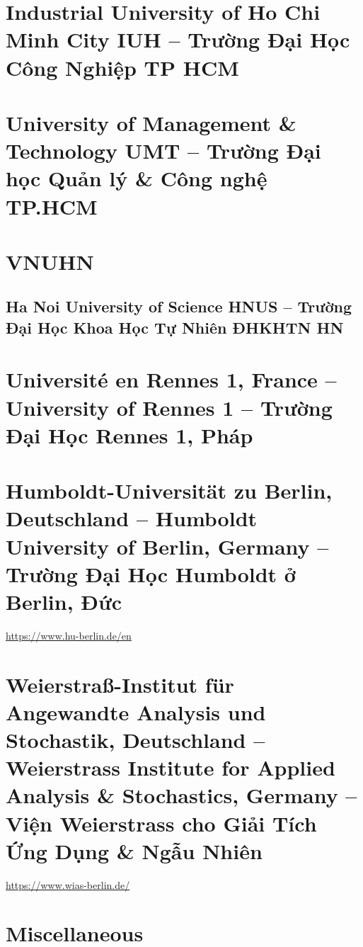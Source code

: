 \documentclass{article}
\begin{document}
\section{Industrial University of Ho Chi Minh City IUH -- Trường Đại Học Công Nghiệp TP HCM}


\section{University of Management \& Technology UMT -- Trường Đại học Quản lý \& Công nghệ TP.HCM}


\section{VNUHN}

\subsection{Ha Noi University of Science HNUS -- Trường Đại Học Khoa Học Tự Nhiên ĐHKHTN HN}


\section{Universit\'e en Rennes 1, France -- University of Rennes 1 -- Trường Đại Học Rennes 1, Pháp}


\section{Humboldt-Universität zu Berlin, Deutschland -- Humboldt University of Berlin, Germany -- Trường Đại Học Humboldt ở Berlin, Đức}
\url{https://www.hu-berlin.de/en}


\section{Weierstraß-Institut für Angewandte Analysis und Stochastik, Deutschland -- Weierstrass Institute for Applied Analysis \& Stochastics, Germany -- Viện Weierstrass cho Giải Tích Ứng Dụng \& Ngẫu Nhiên}
\url{https://www.wias-berlin.de/}


\section{Miscellaneous}


\printbibliography[heading=bibintoc]
	
\end{document}
